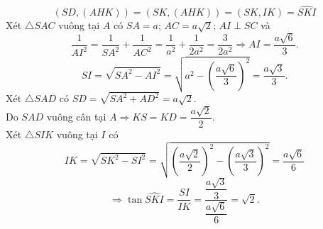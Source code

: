\begin{ex}
{		 \[\left(SD,\left(AHK\right)\right)=\left(SK,\left(AHK\right)\right)=\left(SK,IK\right)=\widehat{SKI}\]
		Xét $\triangle  SAC$ vuông tại $A$ có $SA=a$; $AC=a\sqrt{2}$; $AI\perp SC$ và
		 \[\dfrac{1}{AI^2}=\dfrac{1}{SA^2}+\dfrac{1}{AC^2}=\dfrac{1}{a^2}+\dfrac{1}{2a^2}=\dfrac{3}{2a^2}\Rightarrow AI=\dfrac{a\sqrt{6}}{3}.\]
		 \[SI=\sqrt{SA^2-AI^2}=\sqrt{a^2-\left(\dfrac{a\sqrt{6}}{3} \right)^2}=\dfrac{a\sqrt{3}}{3}.\]
		Xét $\triangle  SAD$ có $SD=\sqrt{SA^2+AD^2}=a\sqrt{2}$.\\
		Do  $SAD$ vuông cân tại $A\Rightarrow KS=KD=\dfrac{a\sqrt{2}}{2}$.\\
		Xét $\triangle SIK$  vuông tại $I$ có
		\[IK=\sqrt{SK^2-SI^2}=\sqrt{\left(\dfrac{a\sqrt{2}}{2} \right)^2-\left(\dfrac{a\sqrt{3}}{3} \right)^2}=\dfrac{a\sqrt{6}}{6}\] 
		\[\Rightarrow \tan \widehat{SKI}=\dfrac{SI}{IK}=\dfrac{\dfrac{a\sqrt{3}}{3}}{\dfrac{a\sqrt{6}}{6}}=\sqrt{2}.\] 
	 }
\end{ex}

